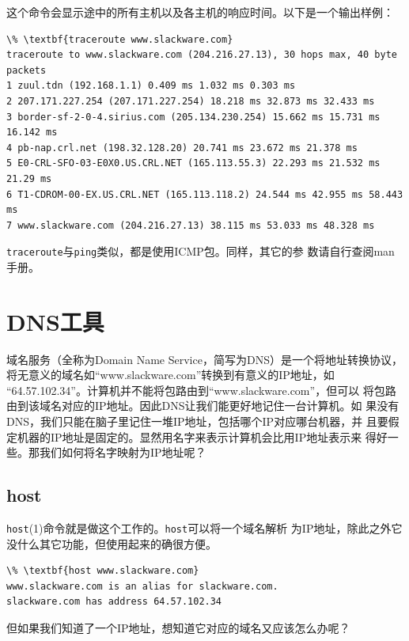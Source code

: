 这个命令会显示途中的所有主机以及各主机的响应时间。以下是一个输出样例：
\begin{Verbatim}[frame=single, commandchars=\\\{\}]
\% \textbf{traceroute www.slackware.com}
traceroute to www.slackware.com (204.216.27.13), 30 hops max, 40 byte packets
1 zuul.tdn (192.168.1.1) 0.409 ms 1.032 ms 0.303 ms
2 207.171.227.254 (207.171.227.254) 18.218 ms 32.873 ms 32.433 ms
3 border-sf-2-0-4.sirius.com (205.134.230.254) 15.662 ms 15.731 ms 16.142 ms
4 pb-nap.crl.net (198.32.128.20) 20.741 ms 23.672 ms 21.378 ms
5 E0-CRL-SFO-03-E0X0.US.CRL.NET (165.113.55.3) 22.293 ms 21.532 ms 21.29 ms
6 T1-CDROM-00-EX.US.CRL.NET (165.113.118.2) 24.544 ms 42.955 ms 58.443 ms
7 www.slackware.com (204.216.27.13) 38.115 ms 53.033 ms 48.328 ms
\end{Verbatim}

\texttt{traceroute}与\texttt{ping}类似，都是使用ICMP包。同样，其它的参
数请自行查阅man手册。

\section{DNS工具}
\label{chap:basicNetworkCommands:dnsTools}
域名服务（全称为Domain Name Service，简写为DNS）是一个将地址转换协议，
将无意义的域名如``www.slackware.com''转换到有意义的IP地址，如
``64.57.102.34''。计算机并不能将包路由到``www.slackware.com''，但可以
将包路由到该域名对应的IP地址。因此DNS让我们能更好地记住一台计算机。如
果没有DNS，我们只能在脑子里记住一堆IP地址，包括哪个IP对应哪台机器，并
且要假定机器的IP地址是固定的。显然用名字来表示计算机会比用IP地址表示来
得好一些。那我们如何将名字映射为IP地址呢？

\subsection{host}
\label{chap:basicNetworkCommands:dnsTools:host}
\texttt{host}(1)命令就是做这个工作的。\texttt{host}可以将一个域名解析
为IP地址，除此之外它没什么其它功能，但使用起来的确很方便。
\begin{Verbatim}[frame=single, commandchars=\\\{\}]
\% \textbf{host www.slackware.com}
www.slackware.com is an alias for slackware.com.
slackware.com has address 64.57.102.34
\end{Verbatim}

但如果我们知道了一个IP地址，想知道它对应的域名又应该怎么办呢？

